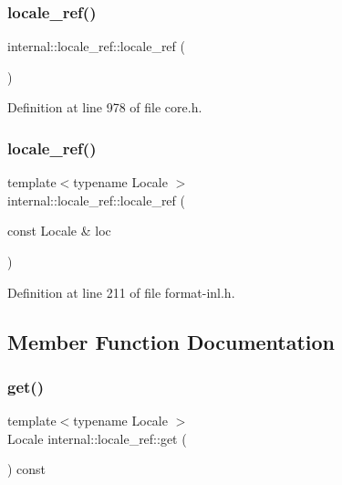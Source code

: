 \subsubsection{\texorpdfstring{locale\+\_\+ref()}{locale\_ref()}\hspace{0.1cm}{\footnotesize\ttfamily [1/2]}}
{\footnotesize\ttfamily internal\+::locale\+\_\+ref\+::locale\+\_\+ref (\begin{DoxyParamCaption}{ }\end{DoxyParamCaption})\hspace{0.3cm}{\ttfamily [inline]}}



Definition at line 978 of file core.\+h.

\mbox{\label{classinternal_1_1locale__ref_a8de4765ebdb0405dd476e1290e28d7b3}} 
\subsubsection{\texorpdfstring{locale\+\_\+ref()}{locale\_ref()}\hspace{0.1cm}{\footnotesize\ttfamily [2/2]}}
{\footnotesize\ttfamily template$<$typename Locale $>$ \\
internal\+::locale\+\_\+ref\+::locale\+\_\+ref (\begin{DoxyParamCaption}\item[{const Locale \&}]{loc }\end{DoxyParamCaption})\hspace{0.3cm}{\ttfamily [explicit]}}



Definition at line 211 of file format-\/inl.\+h.



\subsection{Member Function Documentation}
\mbox{\label{classinternal_1_1locale__ref_a25f8bf16278b8cd7c083aae1a11c49e0}} 
\subsubsection{\texorpdfstring{get()}{get()}}
{\footnotesize\ttfamily template$<$typename Locale $>$ \\
Locale internal\+::locale\+\_\+ref\+::get (\begin{DoxyParamCaption}{ }\end{DoxyParamCaption}) const}



